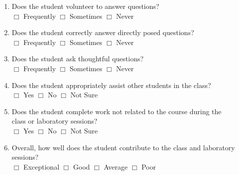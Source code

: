 \documentclass[letterpaper, 10pt]{article} %
\begin{document}
{\begin{enumerate}
\begin{itemize}
\setlength{\itemsep}{1pt}

\item \underline{\hspace*{.75in}}

\end{itemize} \vspace*{-.05in}

\item Does the student volunteer to answer questions?
  \\ \hspace*{.05in} $\Box$ Frequently
  \hspace*{.05in} $\Box$ Sometimes \hspace*{.05in} $\Box$ Never

\item Does the student correctly answer directly posed questions?
  \\ \hspace*{.05in} $\Box$ Frequently
  \hspace*{.05in} $\Box$ Sometimes \hspace*{.05in} $\Box$ Never

\item Does the student ask thoughtful questions?
  \\ \hspace*{.05in} $\Box$ Frequently
  \hspace*{.05in} $\Box$ Sometimes \hspace*{.05in} $\Box$ Never

\item Does the student appropriately assist other students in the class?
  \\ \hspace*{.05in} $\Box$ Yes
  \hspace*{.05in} $\Box$ No \hspace*{.05in} $\Box$ Not Sure

\item Does the student complete work not related to the course during
  the \\ class or laboratory sessions?  \\ \hspace*{.05in} $\Box$ Yes
  \hspace*{.05in} $\Box$ No \hspace*{.05in} $\Box$ Not Sure

\item Overall, how well does the student contribute to the class and
  laboratory sessions?  \\ \hspace*{.05in} $\Box$
  Exceptional \hspace*{.05in} $\Box$ Good \hspace*{.05in} $\Box$
  Average \hspace*{.05in} $\Box$ Poor


\end{enumerate}

}
\end{document}
